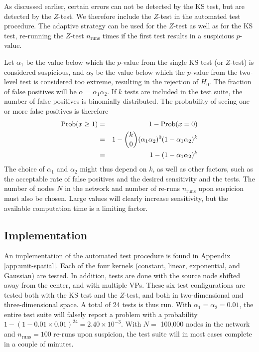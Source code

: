 As discussed earlier, certain errors can not be detected by the KS test, but are detected by the $Z$-test. We therefore include the $Z$-test in the automated test procedure. The adaptive strategy can be used for the $Z$-test as well as for the KS test, re-running the $Z$-test $n_\text{runs}$ times if the first test results in a suspicious $p$-value.

Let $\alpha_1$ be the value below which the $p$-value from the single KS test (or $Z$-test) is considered suspicious, and $\alpha_2$ be the value below which the $p$-value from the two-level test is considered too extreme, resulting in the rejection of $H_0$. The fraction of false positives will be $\alpha = \alpha_1 \alpha_2$. If $k$ tests are included in the test suite, the number of false positives is binomially distributed. The probability of seeing one or more false positives is therefore 
\begin{eqnarray*}
\text{Prob}\!\left(x \ge 1\right) &=& 1 - \text{Prob}\!\left(x=0\right) \\
               &=& 1 - \binom{k}{0} (\alpha_1 \alpha_2)^{0} (1-\alpha_1 \alpha_2)^{k} \\
               &=& 1 - (1 - \alpha_1 \alpha_2)^{k}
\end{eqnarray*}
The choice of $\alpha_1$ and $\alpha_2$ might thus depend on $k$, as well as other factors, such as the acceptable rate of false positives and the desired sensitivity and the tests. The number of nodes $N$ in the network and number of re-runs $n_\text{runs}$ upon suspicion must also be chosen. Large values will clearly increase sensitivity, but the available computation time is a limiting factor.  



\subsection{Implementation\label{subsec:autoimp_spatial}}

An implementation of the automated test procedure is found in Appendix \ref{app:unit-spatial}. Each of the four kernels (constant, linear, exponential, and Gaussian) are tested. In addition, tests are done with the source node shifted away from the center, and with multiple VPs. These six test configurations are tested both with the KS test and the $Z$-test, and both in two-dimensional and three-dimensional space. A total of 24 tests is thus run. With $\alpha_1 = \alpha_2 = 0.01$, the entire test suite will falsely report a problem with a probability $1 - (1 - 0.01\times 0.01)^{24} = 2.40 \times 10^{-3}$. With $N =$ 100,000 nodes in the network and $n_\text{runs} = 100$ re-runs upon suspicion, the test suite will in most cases complete in a couple of minutes.



\clearchapter

